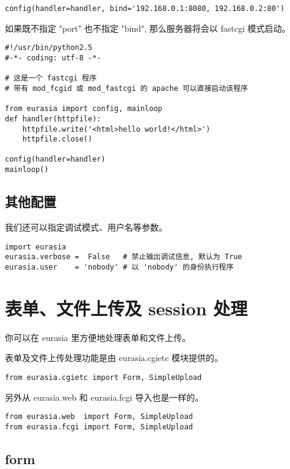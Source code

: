 \documentclass{manual}
\begin{document}
\begin{verbatim}
config(handler=handler, bind='192.168.0.1:8080, 192.168.0.2:80')
\end{verbatim}

如果既不指定 "port" 也不指定 "bind", 那么服务器将会以 fastcgi 模式启动。

\begin{verbatim}
#!/usr/bin/python2.5
#-*- coding: utf-8 -*-

# 这是一个 fastcgi 程序
# 带有 mod_fcgid 或 mod_fastcgi 的 apache 可以直接启动该程序

from eurasia import config, mainloop
def handler(httpfile):
	httpfile.write('<html>hello world!</html>')
	httpfile.close()

config(handler=handler)
mainloop()
\end{verbatim}

\subsection{其他配置}

我们还可以指定调试模式、用户名等参数。

\begin{verbatim}
import eurasia
eurasia.verbose =  False   # 禁止输出调试信息, 默认为 True
eurasia.user    = 'nobody' # 以 'nobody' 的身份执行程序
\end{verbatim}


\section{表单、文件上传及 session 处理}

你可以在 eurasia 里方便地处理表单和文件上传。

表单及文件上传处理功能是由 eurasia.cgietc 模块提供的。

\begin{verbatim}
from eurasia.cgietc import Form, SimpleUpload
\end{verbatim}

另外从 eurasia.web 和 eurasia.fcgi 导入也是一样的。

\begin{verbatim}
from eurasia.web  import Form, SimpleUpload
from eurasia.fcgi import Form, SimpleUpload
\end{verbatim}

\subsection{form}
\end{document}
